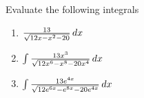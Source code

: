 \documentclass[noinstructornotes]{ximera}
\begin{document}
\begin{problem}
Evaluate the following integrals
	\begin{enumerate}
	
	\item  $ \frac{13}{\sqrt{12x - x^2 - 20}} \,d x$
	\begin{freeResponse}
	
	\end{freeResponse}
	
	
	
	\item  $\int \frac{13x^3}{\sqrt{12x^6 - x^8 - 20x^4}} \,d x$
	\begin{freeResponse}
	
	\end{freeResponse}
	
	
	
	\item  $\int \frac{13e^{4x}}{\sqrt{ 12e^{6x} - e^{8x} - 20e^{4x} }} \,d x$
	\begin{freeResponse}
	
	\end{freeResponse}
	
	\end{enumerate}

\end{problem}

\begin{instructorNotes}

\end{instructorNotes}
















	
	
	
	
	
	
	
	
	

	










								
				
				
	
\end{document}
